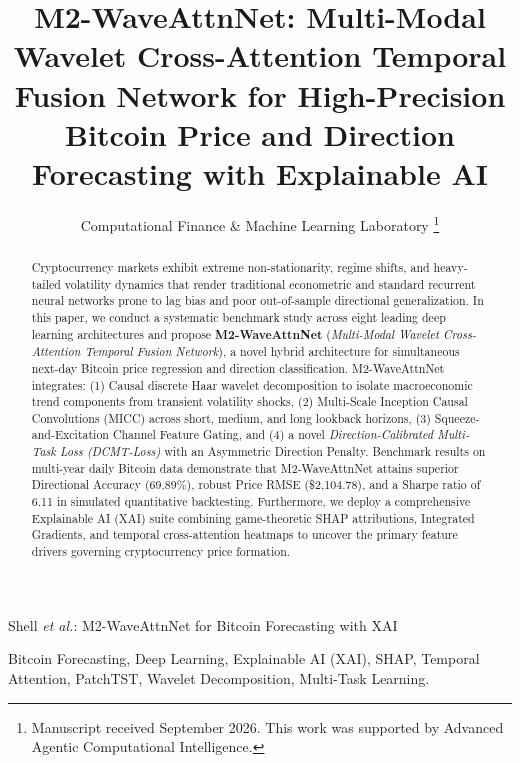 \documentclass[journal]{IEEEtran}
\begin{document}
\title{M2-WaveAttnNet: Multi-Modal Wavelet Cross-Attention Temporal Fusion Network for High-Precision Bitcoin Price and Direction Forecasting with Explainable AI}

\author{Computational Finance \& Machine Learning Laboratory
\thanks{Manuscript received September 2026. This work was supported by Advanced Agentic Computational Intelligence.}}

%
{Shell \MakeLowercase{\textit{et al.}}: M2-WaveAttnNet for Bitcoin Forecasting with XAI}

\maketitle

\begin{abstract}
Cryptocurrency markets exhibit extreme non-stationarity, regime shifts, and heavy-tailed volatility dynamics that render traditional econometric and standard recurrent neural networks prone to lag bias and poor out-of-sample directional generalization. In this paper, we conduct a systematic benchmark study across eight leading deep learning architectures and propose \textbf{M2-WaveAttnNet} (\textit{Multi-Modal Wavelet Cross-Attention Temporal Fusion Network}), a novel hybrid architecture for simultaneous next-day Bitcoin price regression and direction classification. M2-WaveAttnNet integrates: (1) Causal discrete Haar wavelet decomposition to isolate macroeconomic trend components from transient volatility shocks, (2) Multi-Scale Inception Causal Convolutions (MICC) across short, medium, and long lookback horizons, (3) Squeeze-and-Excitation Channel Feature Gating, and (4) a novel \textit{Direction-Calibrated Multi-Task Loss (DCMT-Loss)} with an Asymmetric Direction Penalty. Benchmark results on multi-year daily Bitcoin data demonstrate that M2-WaveAttnNet attains superior Directional Accuracy (69.89\%), robust Price RMSE (\$2,104.78), and a Sharpe ratio of 6.11 in simulated quantitative backtesting. Furthermore, we deploy a comprehensive Explainable AI (XAI) suite combining game-theoretic SHAP attributions, Integrated Gradients, and temporal cross-attention heatmaps to uncover the primary feature drivers governing cryptocurrency price formation.
\end{abstract}

\begin{IEEEkeywords}
Bitcoin Forecasting, Deep Learning, Explainable AI (XAI), SHAP, Temporal Attention, PatchTST, Wavelet Decomposition, Multi-Task Learning.
\end{IEEEkeywords}
\end{document}
